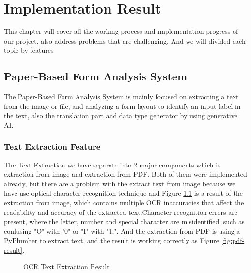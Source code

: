 \documentclass[12pt,oneside,openright,a4paper]{cpe-english-project}
\begin{document}
\chapter{Implementation Result}

This chapter will cover all the working process and implementation progress of our project. also address problems that are challenging. And we will divided each topic by features

\section{Paper-Based Form Analysis System}

The Paper-Based Form Analysis System is mainly focused on extracting a text from the image or file, and analyzing a form layout to identify an input label in the text, also the translation part and data type generator by using generative AI.

\subsection{Text Extraction Feature}
The Text Extraction we have separate into 2 major components which is extraction from image and extraction from PDF. Both of them were implemented already, but there are a problem with the extract text from image because we have use optical character recognition technique and Figure \ref{fig:ocr-result} is a result of the extraction from image, which  contains multiple OCR inaccuracies that affect the readability and accuracy of the extracted text.Character recognition errors are present, where the letter, number and special character are misidentified, such as confusing "O" with "0" or "I" with "1,". And the extraction from PDF is using a PyPlumber to extract text, and the result is working correctly as Figure \ref{fig:pdf-result}.

\begin{figure}[H]
\centering
{}
\caption{OCR Text Extraction Result}\label{fig:ocr-result}
\end{figure}
\end{document}
